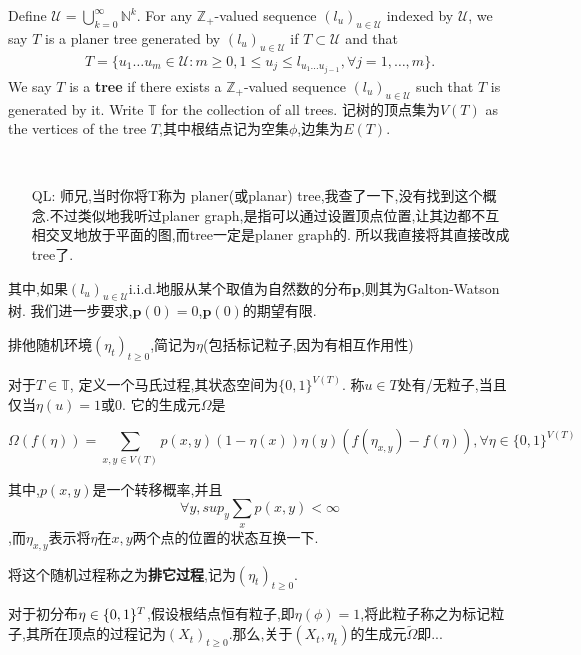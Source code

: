 \documentclass[a4paper,oneside]{ctexbook}
\begin{document}
			Define $\mathcal U = \bigcup_{k=0}^\infty \mathbb N^{k}$.
			For any  $\mathbb Z_+$-valued sequence $(l_u)_{u \in \mathcal U}$ indexed by $\mathcal U$, we say $T$ is a planer tree generated by $(l_u)_{u \in \mathcal U}$ if $T \subset \mathcal U$ and that
			\begin{align}
			T 
			= \{ u_1\dots u_m \in \mathcal U: m \geq 0, 1 \le u_j \leq l_{u_1 \dots u_{j-1}}, \forall j = 1,\dots, m\}.
			\end{align}
			We say $T$ is a \textbf{tree} if there exists a $\mathbb Z_+$-valued sequence $(l_u)_{u \in \mathcal U}$ such that $T$ is generated by it. Write $\mathbb T$ for the collection of all trees. 
			记树的顶点集为$V(T)$ as the vertices of the tree $T$,其中根结点记为空集$\phi$,边集为$E(T)$.
			
			\begin{iss}[Open] ~
				\begin{itemize}
					\item[QL:]
					师兄,当时你将T称为 planer(或planar) tree,我查了一下,没有找到这个概念.不过类似地我听过planer graph,是指可以通过设置顶点位置,让其边都不互相交叉地放于平面的图,而tree一定是planer graph的.
					所以我直接将其直接改成tree了.
				\end{itemize}
			\end{iss}

			其中,如果$(l_u)_{u \in \mathcal U}$i.i.d.地服从某个取值为自然数的分布$\mathbf{p}$,则其为Galton-Watson树.
			我们进一步要求,$\mathbf{p}({0})=0$,$\mathbf{p}({0})$的期望有限.

			排他随机环境$(\eta_t)_{t \ge 0}$,简记为$\eta$(包括标记粒子,因为有相互作用性)

			对于$T \in \mathbb T$, 定义一个马氏过程,其状态空间为$\{0,1\}^{V(T)}$. 称$u \in T$处有/无粒子,当且仅当$\eta(u) = 1$或$0$.
			它的生成元$\Omega$是 

			$$\Omega(f(\eta)) = \sum_{x,y \in V(T)} p(x,y) (1-\eta(x)) \eta(y) (f(\eta_{x,y}) - f(\eta)),\forall \eta \in \{0,1\}^{V(T)}$$

			其中,$p(x,y)$是一个转移概率,并且$$\forall y, sup_y \sum_x p(x,y) < \infty$$,而$\eta_{x,y}$表示将$\eta$在$x,y$两个点的位置的状态互换一下.

			将这个随机过程称之为\textbf{排它过程},记为$(\eta_t)_{t\ge0}$.
			 
			对于初分布$\eta \in \mathbf \{0,1\}^{T}$,假设根结点恒有粒子,即$\eta(\phi) = 1$,将此粒子称之为标记粒子,其所在顶点的过程记为$(X_t)_{t \ge 0}$.那么,关于$(X_t,\eta_t)$的生成元$\widetilde{\Omega}$即...
\end{document}
